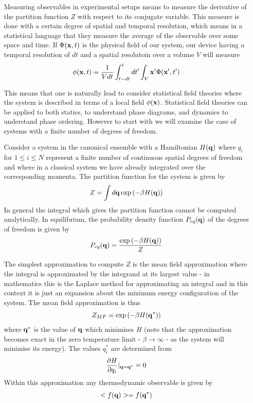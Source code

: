 Measuring observables in experimental setups means to measure the derivative of the partition function $Z$ with respect to its conjugate variable. This measure is done with a certain degree of spatial and temporal resolution, which means in a statistical language that they measure the average of the observable over some space and time. If $\Phi({\bf x},t)$ is the physical field of our system, our device having a temporal resolution of $dt$ and a spatial resolutoin over a volume $V$ will measure
\begin{align}
\phi({\bf x},t) = \frac{1}{V dt} \int_{t-dt}^{t} dt' \int_V {\bf x}' \Phi({\bf x}',t')
\label{renormalisation}
\end{align}


This means that one is naturally lead to consider statistical field theories where the system is described in terms of a local field $\phi({\bf x})$. Statistical field theories can be applied to both statics, to understand phase diagrams, and dynamics to understand phase ordering. However to start with we will examine the case of systems with a finite number of degrees of freedom. 

Consider a system in the canonical ensemble with a Hamiltonian $H({\bf q})$ where $q_i$ for 
$1\leq i\leq N$ represent a finite number of continuous spatial degrees of freedom and where in a classical system we have already integrated over the corresponding momenta. The partition function for the system is given by
\begin{equation}
Z = \int d{\bf q} \exp\left(-\beta H({\bf q})\right)
\end{equation}
In general the integral which gives the partition function cannot be computed analytically. In equilibrium, the probability density function $P_{eq}({\bf q})$ of the degrees of freedom is given by 
\begin{equation}
P_{eq}({\bf q}) = \frac{\exp\left(-\beta H({\bf q})\right)}{Z}
\label{eqdis}
\end{equation}

The simplest approximation to compute $Z$ is the mean field approximation where the integral 
is approximated by the integrand at its largest value - in mathematics this is the Laplace method for approximating an integral and in this context it is just an expansion about the minimum energy configuration of the system. The mean field approximation is thus
\begin{equation}
Z_{MF}= \exp\left(-\beta H({\bf q}^*)\right)
\end{equation}
where ${\bf q}^*$ is the value of ${\bf q}$ which minimises $H$ (note that the approximation becomes exact in the zero temperature limit - $\beta \to \infty$ - as the system will minimise its energy). The values $q_i^*$ are determined from
\begin{equation}
\frac{\partial H}{\partial q_i}|_{{\bf q}={\bf q^*}}=0
\end{equation}
Within this approximation any thermodynamic observable is given by
\begin{equation}
< f({\bf q}) > = f({\bf q}^*)
\end{equation}

